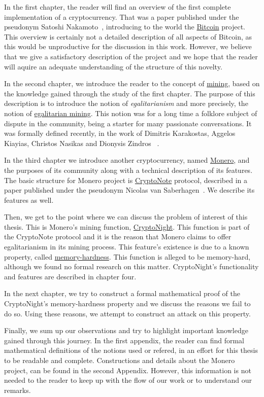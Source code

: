 In the first chapter, the reader will find an overview of the first complete implementation of a cryptocurrency. That was a paper published under the pseudonym Satoshi Nakamoto~\cite{Nakamoto_bitcoin:a}, introducing to the world the \hyperref[sec:Bitcoin]{Bitcoin} project. This overview is certainly not a detailed description of all aspects of Bitcoin, as this would be unproductive for the discussion in this work. However, we believe that we give a satisfactory description of the project and we hope that the reader will aquire an adequate understanding of the structure of this novelty.

In the second chapter, we introduce the reader to the concept of \hyperref[sec:mining]{mining}, based on the knowledge gained through the study of the first chapter. The purpose of this description is to introduce the notion of \emph{egalitarianism} and more precisely, the notion of \hyperref[sec:egalitarian]{egalitarian mining}. This notion was for a long time a folklore subject of dispute in the community, being a starter for many passionate conversations. It was formally defined recently, in the work of Dimitris Karakostas, Aggelos Kiayias, Christos Nasikas and Dionysis Zindros ~\cite{egalitarianism}.
\pagebreak

In the third chapter we introduce another cryptocurrency, named \hyperref[sec:Monero]{Monero}, and the purposes of its community along with a technical description of its features. The basic structure for Monero project is \hyperref[sec:CryptoNote]{CryptoNote} protocol, described in a paper published under the pseudonym Nicolas van Saberhagen~\cite{citeulike:14139412}. We describe its features as well.

Then, we get to the point where we can discuss the problem of interest of this thesis. This is Monero's mining function, \hyperref[ch:cryptonight]{CryptoNight}. This function is part of the CryptoNote protocol and it is the reason that Monero claims to offer egalitarianism in its mining process. This feature's existence is due to a known property, called \hyperref[sec:memory-hard]{memory-hardness}. This function is alleged to be memory-hard, although we found no formal research on this matter. CryptoNight's functionality and features are described in chapter four.

In the next chapter, we try to construct a formal mathematical proof of the CryptoNight's memory-hardness property and we discuss the reasons we fail to do so. Using these reasons, we attempt to construct an attack on this property.

Finally, we sum up our observations and try to highlight important knowledge gained through this journey. In the first appendix, the reader can find formal mathematical definitions of the notions used or refered, in an effort for this thesis to be readable and complete. Constructions and details about the Monero project, can be found in the second Appendix. However, this information is not needed to the reader to keep up with the flow of our work or to understand our remarks.
